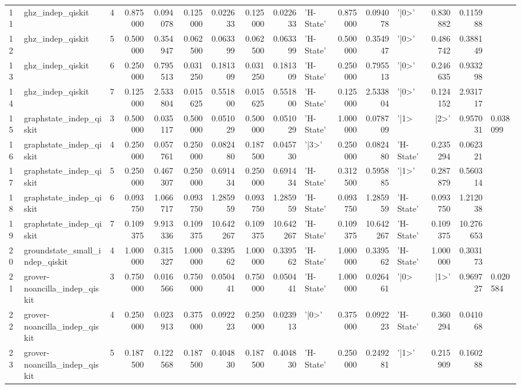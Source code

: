 \begin{table}
\begin{tabular}{llrrrrrrrlrrlrr}
11 & ghz_indep_qiskit & 4 & 0.875000 & 0.094078 & 0.125000 & 0.022633 & 0.125000 & 0.022633 & 'H-State' & 0.875000 & 0.094078 & '|0>' & 0.830882 & 0.115988 \\
12 & ghz_indep_qiskit & 5 & 0.500000 & 0.354947 & 0.062500 & 0.063399 & 0.062500 & 0.063399 & 'H-State' & 0.500000 & 0.354947 & '|0>' & 0.486742 & 0.388149 \\
13 & ghz_indep_qiskit & 6 & 0.250000 & 0.795513 & 0.031250 & 0.181309 & 0.031250 & 0.181309 & 'H-State' & 0.250000 & 0.795513 & '|0>' & 0.246635 & 0.933298 \\
14 & ghz_indep_qiskit & 7 & 0.125000 & 2.533804 & 0.015625 & 0.551800 & 0.015625 & 0.551800 & 'H-State' & 0.125000 & 2.533804 & '|0>' & 0.124152 & 2.931717 \\
15 & graphstate_indep_qiskit & 3 & 0.500000 & 0.035117 & 0.500000 & 0.051029 & 0.500000 & 0.051029 & 'H-State' & 1.000000 & 0.078709 & '|1> & |2>' & 0.957031 & 0.038099 \\
16 & graphstate_indep_qiskit & 4 & 0.250000 & 0.057761 & 0.250000 & 0.082480 & 0.187500 & 0.045730 & '|3>' & 0.250000 & 0.082480 & 'H-State' & 0.235294 & 0.062321 \\
17 & graphstate_indep_qiskit & 5 & 0.250000 & 0.467307 & 0.250000 & 0.691434 & 0.250000 & 0.691434 & 'H-State' & 0.312500 & 0.595885 & '|1>' & 0.287879 & 0.560314 \\
18 & graphstate_indep_qiskit & 6 & 0.093750 & 1.066717 & 0.093750 & 1.285959 & 0.093750 & 1.285959 & 'H-State' & 0.093750 & 1.285959 & 'H-State' & 0.093750 & 1.212038 \\
19 & graphstate_indep_qiskit & 7 & 0.109375 & 9.913336 & 0.109375 & 10.642267 & 0.109375 & 10.642267 & 'H-State' & 0.109375 & 10.642267 & 'H-State' & 0.109375 & 10.276653 \\
20 & groundstate_small_indep_qiskit & 4 & 1.000000 & 0.315327 & 1.000000 & 0.339562 & 1.000000 & 0.339562 & 'H-State' & 1.000000 & 0.339562 & 'H-State' & 1.000000 & 0.303173 \\
21 & grover-noancilla_indep_qiskit & 3 & 0.750000 & 0.016566 & 0.750000 & 0.050441 & 0.750000 & 0.050441 & 'H-State' & 1.000000 & 0.026461 & '|0> & |1>' & 0.969727 & 0.020584 \\
22 & grover-noancilla_indep_qiskit & 4 & 0.250000 & 0.023913 & 0.375000 & 0.092223 & 0.250000 & 0.023913 & '|0>' & 0.375000 & 0.092223 & 'H-State' & 0.360294 & 0.041068 \\
23 & grover-noancilla_indep_qiskit & 5 & 0.187500 & 0.122568 & 0.187500 & 0.404830 & 0.187500 & 0.404830 & 'H-State' & 0.250000 & 0.249281 & '|1>' & 0.215909 & 0.160288 \\

\end{tabular}
\end{table}
